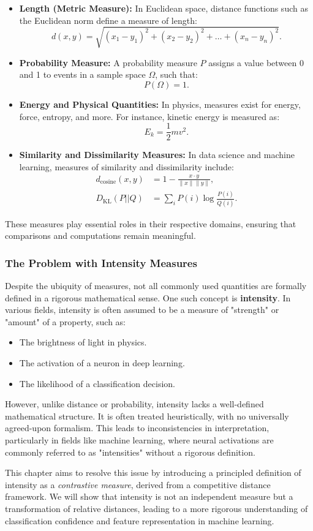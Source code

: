 \begin{itemize}
    \item \textbf{Length (Metric Measure):} In Euclidean space, distance functions such as the Euclidean norm define a measure of length:
    \[
    d(x, y) = \sqrt{(x_1 - y_1)^2 + (x_2 - y_2)^2 + \dots + (x_n - y_n)^2}.
    \]
    \item \textbf{Probability Measure:} A probability measure \( P \) assigns a value between 0 and 1 to events in a sample space \( \Omega \), such that:
    \[
    P(\Omega) = 1.
    \]
    \item \textbf{Energy and Physical Quantities:} In physics, measures exist for energy, force, entropy, and more. For instance, kinetic energy is measured as:
    \[
    E_k = \frac{1}{2} m v^2.
    \]
    \item \textbf{Similarity and Dissimilarity Measures:} In data science and machine learning, measures of similarity and dissimilarity include:
    \begin{align}
        d_{\text{cosine}}(x, y) &= 1 - \frac{x \cdot y}{\|x\| \|y\|}, \\
        D_{\text{KL}}(P || Q) &= \sum_i P(i) \log \frac{P(i)}{Q(i)}.
    \end{align}
\end{itemize}

These measures play essential roles in their respective domains, ensuring that comparisons and computations remain meaningful.

\subsubsection{The Problem with Intensity Measures}

Despite the ubiquity of measures, not all commonly used quantities are formally defined in a rigorous mathematical sense. One such concept is \textbf{intensity}. In various fields, intensity is often assumed to be a measure of "strength" or "amount" of a property, such as:

\begin{itemize}
    \item The brightness of light in physics.
    \item The activation of a neuron in deep learning.
    \item The likelihood of a classification decision.
\end{itemize}

However, unlike distance or probability, intensity lacks a well-defined mathematical structure. It is often treated heuristically, with no universally agreed-upon formalism. This leads to inconsistencies in interpretation, particularly in fields like machine learning, where neural activations are commonly referred to as "intensities" without a rigorous definition.

This chapter aims to resolve this issue by introducing a principled definition of intensity as a \textit{contrastive measure}, derived from a competitive distance framework. We will show that intensity is not an independent measure but a transformation of relative distances, leading to a more rigorous understanding of classification confidence and feature representation in machine learning.


